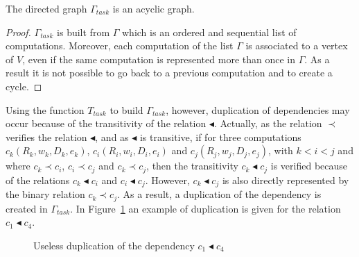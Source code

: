 \begin{myprop}
The directed graph $\Gamma_{task}$ is an acyclic graph.
\end{myprop}

\begin{proof}
$\Gamma_{task}$ is built from $\Gamma$ which is an ordered and sequential list of computations. Moreover, each computation of the list $\Gamma$ is associated to a vertex of $V$, even if the same computation is represented more than once in $\Gamma$. As a result it is not possible to go back to a previous computation and to create a cycle.
\end{proof}

Using the function $T_{task}$ to build $\Gamma_{task}$, however, duplication of dependencies may occur because of the transitivity of the relation $\blacktriangleleft$. Actually, as the relation $\prec$ verifies the relation $\blacktriangleleft$, and as $\blacktriangleleft$ is transitive, if for three computations $c_k(R_k,w_k,D_k,e_k)$, $c_i(R_i,w_i,D_i,e_i)$ and $c_j(R_j,w_j,D_j,e_j)$, with $k<i<j$ and where $c_k \prec c_i$, $c_i \prec c_j$ and $c_k \prec c_j$, then the transitivity $c_k \blacktriangleleft c_j$ is verified because of the relations $c_k \blacktriangleleft c_i$ and $c_i \blacktriangleleft c_j$. However, $c_k \blacktriangleleft c_j$ is also directly represented by the binary relation $c_k \prec c_j$. As a result, a duplication of the dependency is created in $\Gamma_{task}$. In Figure~\ref{fig:duplication} an example of duplication is given for the relation $c_1 \blacktriangleleft c_4$.

\begin{figure}[h!]
\begin{center}
  \caption{Useless duplication of the dependency $c_1 \blacktriangleleft c_4$}
  \label{fig:duplication}
\end{center}
\end{figure}

